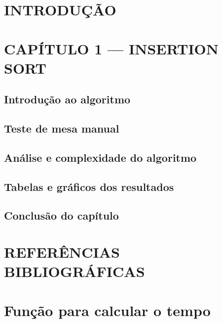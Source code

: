 \documentclass[12pt,arial]{article}
\begin{document}
		\tableofcontents
		\newpage
  
		\section{INTRODUÇÃO}
		
		\newpage

		\section{CAPÍTULO 1 --- INSERTION SORT}

		\subsection{Introdução ao algoritmo}
		
		\newpage

		\subsection{Teste de mesa manual}
		
		\newpage

		\subsection{Análise e complexidade do algoritmo}
		\label{sec:analise_insertion}
		
		\newpage

		\subsection{Tabelas e gráficos dos resultados}
		
		\newpage

		\subsection{Conclusão do capítulo}
		
		\newpage


		\section{REFERÊNCIAS BIBLIOGRÁFICAS}
		
		\newpage

		\section{Função para calcular o tempo}
			
\end{document}
